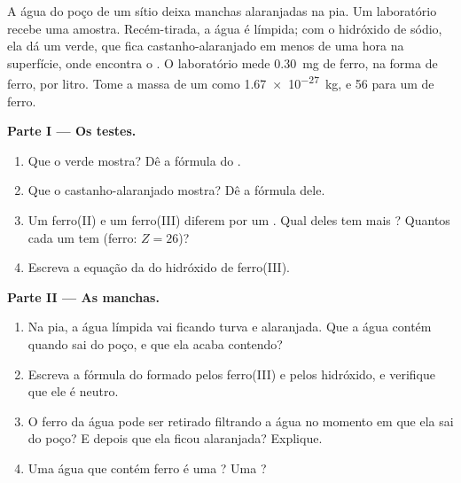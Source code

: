 \begin{problem}
\label{pb:g9:ions:1}
A água do poço de um sítio deixa manchas alaranjadas na pia. Um
laboratório recebe uma amostra. Recém-tirada, a água é límpida; com o
hidróxido de sódio, ela dá um  verde, que fica
castanho-alaranjado em menos de uma hora na superfície, onde encontra o
. O laboratório mede \qty{0.30}{mg} de ferro, na forma de  ferro,
por litro. Tome a massa de um  como \qty{1.67e-27}{kg}, e 56
 para um  de ferro.

\medskip
\noindent\textbf{Parte I --- Os testes.}
\begin{enumerate}
  \item Que  o  verde mostra? Dê a fórmula do .
  \item Que  o  castanho-alaranjado mostra? Dê a fórmula
        dele.
  \item Um  ferro(II) e um  ferro(III) diferem por um . Qual
        deles tem mais ? Quantos  cada um tem (ferro:
        $Z = 26$)?
  \item Escreva a equação da  do hidróxido de ferro(III).
\end{enumerate}

\medskip
\noindent\textbf{Parte II --- As manchas.}
\begin{enumerate}[resume]
  \item Na pia, a água límpida vai ficando turva e alaranjada. Que  a
        água contém quando sai do poço, e que  ela acaba contendo?
  \item Escreva a fórmula do  formado pelos  ferro(III)
        e pelos  hidróxido, e verifique que ele é neutro.
  \item O ferro da água pode ser retirado filtrando a água no momento em
        que ela sai do poço? E depois que ela ficou alaranjada? Explique.
  \item Uma água que contém  ferro é uma ? Uma ?
\end{enumerate}


\end{problem}
